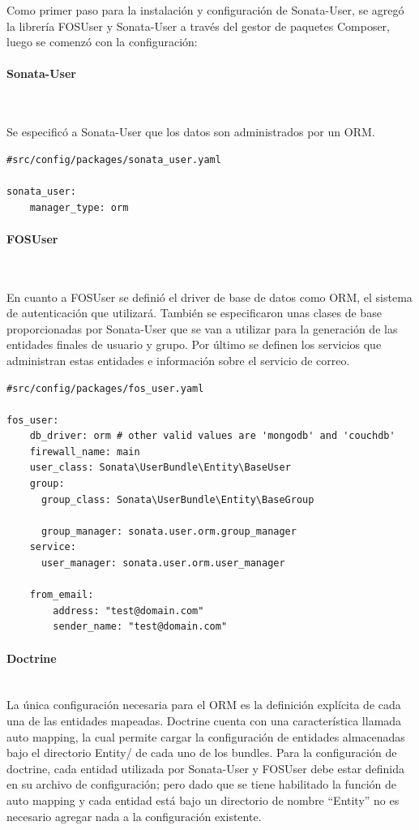 \documentclass{article}
\newcommand{\myparagraph}[1]{\paragraph{#1}\mbox{}\\}
\begin{document}
Como primer paso para la instalación y configuración de Sonata-User, se agregó la librería FOSUser y Sonata-User a través del gestor de paquetes Composer,
luego se comenzó con la configuración:

\paragraph{Sonata-User}~\newline

Se especificó a Sonata-User que los datos son administrados por un ORM.

\begin{lstlisting}[caption=archivo de configuración de sonata-user]
#src/config/packages/sonata_user.yaml

sonata_user:
    manager_type: orm

\end{lstlisting}

\paragraph{FOSUser}~\newline

En cuanto a FOSUser se definió el driver de base de datos como ORM, el sistema de autenticación que utilizará\@. También se especificaron unas clases de base
proporcionadas por Sonata-User que se van a utilizar para la generación de las entidades finales de usuario y grupo\@. Por último se definen los servicios
que administran estas entidades e información sobre el servicio de correo.

\begin{lstlisting}[caption=archivo de configuración de FOSUser]
#src/config/packages/fos_user.yaml

fos_user:
    db_driver: orm # other valid values are 'mongodb' and 'couchdb'
    firewall_name: main
    user_class: Sonata\UserBundle\Entity\BaseUser
    group:
      group_class: Sonata\UserBundle\Entity\BaseGroup

      group_manager: sonata.user.orm.group_manager
    service:
      user_manager: sonata.user.orm.user_manager

    from_email:
        address: "test@domain.com"
        sender_name: "test@domain.com"

\end{lstlisting}

\myparagraph{Doctrine}


La única configuración necesaria para el ORM es la definición explícita de cada una de las entidades mapeadas.
Doctrine cuenta con una característica llamada auto mapping, la cual permite cargar la configuración de entidades almacenadas bajo el directorio Entity/
de cada uno de los bundles.
Para la configuración de doctrine, cada entidad utilizada por Sonata-User y FOSUser debe estar definida en su archivo de configuración; pero dado que se
tiene habilitado la función de auto mapping y cada entidad está bajo un directorio de nombre “Entity” no es necesario agregar nada a la configuración existente.
\end{document}
